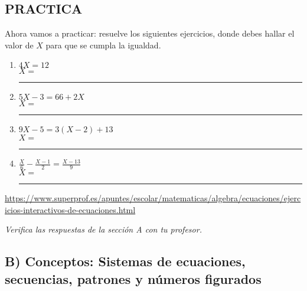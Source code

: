 \documentclass[12pt,a4paper]{article}
\begin{document}
\subsection*{PRACTICA}

Ahora vamos a practicar: resuelve los siguientes ejercicios, donde debes hallar el valor de $X$ para que se cumpla la igualdad.

\begin{enumerate}[label=\alph*)]
    \item $4X = 12$ \\
    $X =$ \rule{2cm}{0.4pt}

    \item $5X - 3 = 66 + 2X$ \\
    $X =$ \rule{2cm}{0.4pt}

    \item $9X - 5 = 3(X - 2) + 13$ \\
    $X =$ \rule{2cm}{0.4pt}

    \item $\frac{X}{6} - \frac{X-1}{2} = \frac{X-13}{9}$ \\
    $X =$ \rule{2cm}{0.4pt}
\end{enumerate}

\begin{center}
\url{https://www.superprof.es/apuntes/escolar/matematicas/algebra/ecuaciones/ejercicios-interactivos-de-ecuaciones.html}

\textit{Verifica las respuestas de la sección A con tu profesor.}
\end{center}

\vspace{1.5cm}
\subsection*{B) Conceptos: Sistemas de ecuaciones, secuencias, patrones y números figurados}
\end{document}
